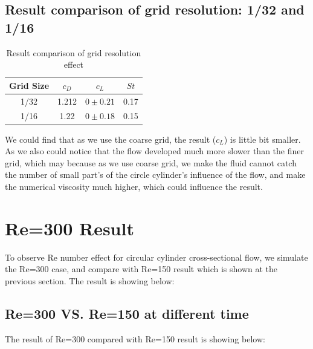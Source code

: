 \documentclass[12pt]{article}
\begin{document}
\subsection{Result comparison of grid resolution: 1/32 and 1/16}

\begin{table}[H]
\centering
\caption{Result comparison of grid resolution effect}
\begin{tabular}{c|ccc}
\toprule
Grid Size & $c_D$ & $c_L$ & $St$ \\
\midrule
1/32 & 1.212 & $0 \pm 0.21$ & 0.17 \\
1/16 & 1.22 & $0 \pm 0.18 $ & 0.15 \\
\bottomrule
\end{tabular}
\end{table}

We could find that as we use the coarse grid, the result ($c_L$) is little bit smaller. As we also could notice that the flow developed much more slower than the finer grid, which may because as we use coarse grid, we make the fluid cannot catch the number of small part's of the circle cylinder's influence of the flow, and make the numerical viscosity much higher, which could influence the result.




 






\newpage
\section{Re=300 Result}
To observe Re number effect for circular cylinder cross-sectional flow, we simulate the Re=300 case, and compare with Re=150 result which is shown at the previous section. The result is showing below:

\subsection{Re=300 VS. Re=150 at different time }
The result of Re=300 compared with Re=150 result is showing below:
\end{document}
